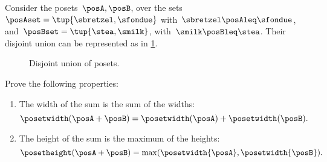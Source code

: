 \begin{example}
    Consider the posets~$\posA,\posB$, over the sets~$\posAset=\tup{\sbretzel, \sfondue}$ with~$\sbretzel \posAleq \sfondue$, and~$\posBset=\tup{\stea,\smilk}$, with~$\smilk \posBleq \stea$.
    Their disjoint union can be represented as in \cref{fig:poset-coproduct}.

    \begin{figure}[h!]
        \centering
        \caption{Disjoint union of posets.}
        \label{fig:poset-coproduct}
    \end{figure}
\end{example}
\vfill
\begin{gradedexercise}
    Prove the following properties:
    \begin{enumerate}
        \item The width of the sum is the sum of the widths:
              \begin{equation*}
                  \posetwidth(\posA + \posB) = \posetwidth(\posA) + \posetwidth(\posB).
              \end{equation*}
        \item The height of the sum is the maximum of the heights:
              \begin{equation*}
                  \posetheight(\posA + \posB) = \max(\posetwidth{\posA}, \posetwidth{\posB}).
              \end{equation*}
    \end{enumerate}
\end{gradedexercise}
